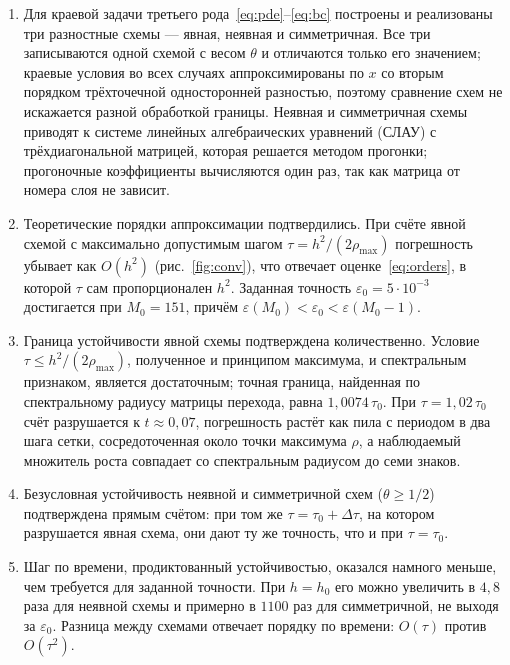\documentclass[12pt,a4paper]{article}
\begin{document}
\begin{enumerate}
\item Для краевой задачи третьего рода~\eqref{eq:pde}--\eqref{eq:bc}
построены и реализованы три разностные схемы --- явная, неявная и
симметричная. Все три записываются одной схемой с весом $\theta$ и
отличаются только его значением; краевые условия во всех случаях
аппроксимированы по $x$ со вторым порядком трёхточечной односторонней
разностью, поэтому сравнение схем не искажается разной обработкой
границы. Неявная и симметричная схемы приводят к системе линейных
алгебраических уравнений (СЛАУ) с трёхдиагональной матрицей, которая
решается методом прогонки; прогоночные коэффициенты вычисляются один
раз, так как матрица от номера слоя не зависит.

\item Теоретические порядки аппроксимации подтвердились. При счёте
явной схемой с максимально допустимым шагом $\tau=h^2/(2\rho_{\max})$
погрешность убывает как $O(h^2)$ (рис.~\ref{fig:conv}), что отвечает
оценке~\eqref{eq:orders}, в которой $\tau$ сам пропорционален $h^2$.
Заданная точность $\varepsilon_0=5\cdot10^{-3}$ достигается при
$M_0=151$, причём $\varepsilon(M_0)<\varepsilon_0<\varepsilon(M_0-1)$.

\item Граница устойчивости явной схемы подтверждена количественно.
Условие $\tau\le h^2/(2\rho_{\max})$, полученное и принципом максимума,
и спектральным признаком, является достаточным; точная граница,
найденная по спектральному радиусу матрицы перехода, равна
$1{,}0074\,\tau_0$. При $\tau=1{,}02\,\tau_0$ счёт разрушается к
$t\approx0{,}07$, погрешность растёт как пила с периодом в два шага
сетки, сосредоточенная около точки максимума $\rho$, а наблюдаемый
множитель роста совпадает со спектральным радиусом до семи знаков.

\item Безусловная устойчивость неявной и симметричной схем
($\theta\ge1/2$) подтверждена прямым счётом: при том же
$\tau=\tau_0+\Delta\tau$, на котором разрушается явная схема, они дают
ту же точность, что и при $\tau=\tau_0$.

\item Шаг по времени, продиктованный устойчивостью, оказался намного
меньше, чем требуется для заданной точности. При $h=h_0$ его можно
увеличить в $4{,}8$ раза для неявной схемы и примерно в $1100$ раз для
симметричной, не выходя за $\varepsilon_0$. Разница между схемами
отвечает порядку по времени: $O(\tau)$ против $O(\tau^2)$.


\end{enumerate}
\end{document}
